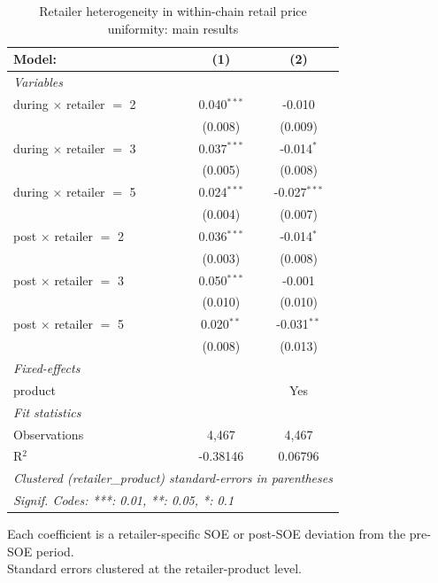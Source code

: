 
\begin{table}[htbp]
   \caption{\label{tab:uniformity_heterog_retail_main} Retailer heterogeneity in within-chain retail price uniformity: main results}
   \centering
   \begin{tabular}{lcc}
      \tabularnewline \midrule \midrule
      Model:                          & (1)           & (2)\\  
      \midrule
      \emph{Variables}\\
      during $\times$ retailer $=$ 2  & 0.040$^{***}$ & -0.010\\   
                                      & (0.008)       & (0.009)\\   
      during $\times$ retailer $=$ 3  & 0.037$^{***}$ & -0.014$^{*}$\\   
                                      & (0.005)       & (0.008)\\   
      during $\times$ retailer $=$ 5  & 0.024$^{***}$ & -0.027$^{***}$\\   
                                      & (0.004)       & (0.007)\\   
      post $\times$ retailer $=$ 2    & 0.036$^{***}$ & -0.014$^{*}$\\   
                                      & (0.003)       & (0.008)\\   
      post $\times$ retailer $=$ 3    & 0.050$^{***}$ & -0.001\\   
                                      & (0.010)       & (0.010)\\   
      post $\times$ retailer $=$ 5    & 0.020$^{**}$  & -0.031$^{**}$\\   
                                      & (0.008)       & (0.013)\\   
      \midrule
      \emph{Fixed-effects}\\
      product                         &               & Yes\\  
      \midrule
      \emph{Fit statistics}\\
      Observations                    & 4,467         & 4,467\\  
      R$^2$                           & -0.38146      & 0.06796\\  
      \midrule \midrule
      \multicolumn{3}{l}{\emph{Clustered (retailer\_product) standard-errors in parentheses}}\\
      \multicolumn{3}{l}{\emph{Signif. Codes: ***: 0.01, **: 0.05, *: 0.1}}\\
   \end{tabular}
   
   \par \raggedright 
   Each coefficient is a retailer-specific SOE or post-SOE deviation from the pre-SOE period.\\
   Standard errors clustered at the retailer-product level.
\end{table}


